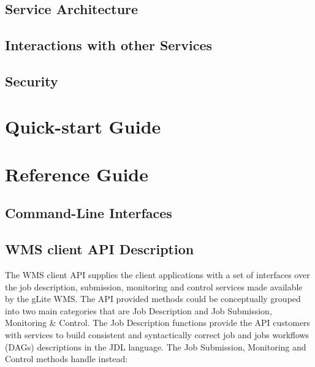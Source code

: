\documentclass{egee}
\begin{document}
\subsection{Service Architecture}
\label{arch}



\subsection{Interactions with other Services}
\label{interactions}


\subsection {Security} 
\label{security}

 
\section{Quick-start Guide}
\label{quickstart}


\newpage
\section{Reference Guide}
\label{refguide}


\subsection{Command-Line Interfaces}
\label{cli}



\newpage

\subsection{WMS client API Description}

The WMS client API supplies the client applications with a set of interfaces over the job description, 
submission, monitoring and control services made available by the gLite WMS.
The API provided methods could be conceptually grouped into two main categories that are Job Description and 
Job Submission, Monitoring \& Control. 
The Job Description functions provide the API customers with services to build consistent and syntactically 
correct job and jobs workflows (DAGs) descriptions in the JDL language. 
The Job Submission, Monitoring and Control methods handle instead:
\end{document}
